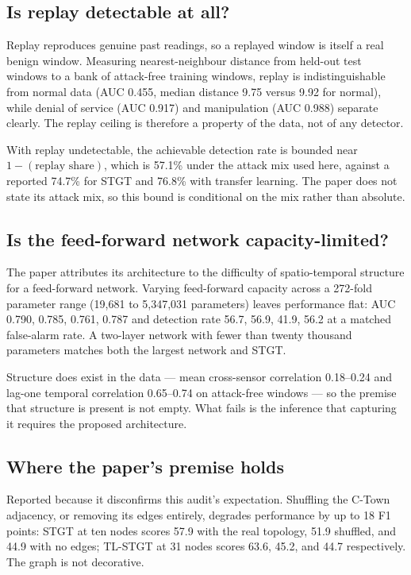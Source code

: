 \documentclass[11pt]{article}
\begin{document}
\subsection{Is replay detectable at all?}

Replay reproduces genuine past readings, so a replayed window is itself a real
benign window. Measuring nearest-neighbour distance from held-out test windows
to a bank of attack-free training windows, replay is indistinguishable from
normal data (AUC 0.455, median distance 9.75 versus 9.92 for normal), while
denial of service (AUC 0.917) and manipulation (AUC 0.988) separate clearly.
The replay ceiling is therefore a property of the data, not of any detector.

With replay undetectable, the achievable detection rate is bounded near
$1 - (\text{replay share})$, which is 57.1\% under the attack mix used here,
against a reported 74.7\% for STGT and 76.8\% with transfer learning. The paper
does not state its attack mix, so this bound is conditional on the mix rather
than absolute.

\subsection{Is the feed-forward network capacity-limited?}

The paper attributes its architecture to the difficulty of spatio-temporal
structure for a feed-forward network. Varying feed-forward capacity across a
272-fold parameter range (19{,}681 to 5{,}347{,}031 parameters) leaves
performance flat: AUC 0.790, 0.785, 0.761, 0.787 and detection rate 56.7, 56.9,
41.9, 56.2 at a matched false-alarm rate. A two-layer network with fewer than
twenty thousand parameters matches both the largest network and STGT.

Structure does exist in the data --- mean cross-sensor correlation 0.18--0.24
and lag-one temporal correlation 0.65--0.74 on attack-free windows --- so the
premise that structure is present is not empty. What fails is the inference that
capturing it requires the proposed architecture.

\subsection{Where the paper's premise holds}

Reported because it disconfirms this audit's expectation. Shuffling the C-Town
adjacency, or removing its edges entirely, degrades performance by up to 18 F1
points: STGT at ten nodes scores 57.9 with the real topology, 51.9 shuffled, and
44.9 with no edges; TL-STGT at 31 nodes scores 63.6, 45.2, and 44.7 respectively.
The graph is not decorative.
\end{document}
